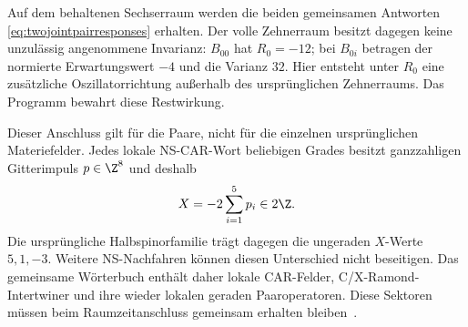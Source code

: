 Auf dem behaltenen Sechserraum werden die beiden gemeinsamen Antworten
\eqref{eq:twojointpairresponses} erhalten. Der volle Zehnerraum besitzt dagegen
keine unzulässig angenommene Invarianz: $B_{00}$ hat $R_0=-12$;
bei $B_{0i}$ betragen der normierte Erwartungswert $-4$ und die Varianz $32$.
Hier entsteht unter $R_0$ eine zusätzliche Oszillatorrichtung außerhalb des
ursprünglichen Zehnerraums. Das Programm bewahrt diese Restwirkung.

Dieser Anschluss gilt für die Paare, nicht für die einzelnen ursprünglichen
Materiefelder. Jedes lokale NS-CAR-Wort beliebigen Grades besitzt ganzzahligen
Gitterimpuls $p\in\Z^8$ und deshalb
\[
 X=-2\sum_{i=1}^5p_i\in2\Z.
\]
Die ursprüngliche Halbspinorfamilie trägt dagegen die ungeraden $X$-Werte
$5,1,-3$. Weitere NS-Nachfahren können diesen Unterschied nicht beseitigen.
Das gemeinsame Wörterbuch enthält daher lokale CAR-Felder, C/X-Ramond-Intertwiner
und ihre wieder lokalen geraden Paaroperatoren. Diese Sektoren müssen beim
Raumzeitanschluss gemeinsam erhalten bleiben~\cite{boylesmith,barronfermion}.


